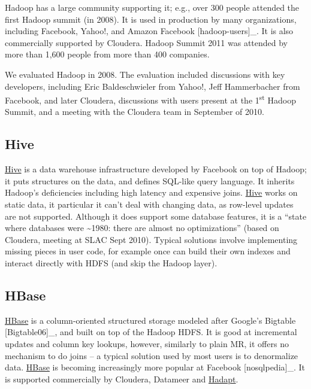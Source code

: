 \documentclass[DM,lsstdraft,toc]{lsstdoc}
\begin{document}
Hadoop has a large community supporting it; e.g., over 300 people
attended the first Hadoop summit (in 2008). It is used in production by
many organizations, including Facebook, Yahoo!, and Amazon Facebook
{[}hadoop-users{]}\_. It is also commercially supported by Cloudera.
Hadoop Summit 2011 was attended by more than 1,600 people from more than
400 companies.

We evaluated Hadoop in 2008. The evaluation included discussions with
key developers, including Eric Baldeschwieler from Yahoo!, Jeff
Hammerbacher from Facebook, and later Cloudera, discussions with users
present at the 1\textsuperscript{st} Hadoop Summit, and a meeting with
the Cloudera team in September of 2010.

\subsection{Hive}\label{hive}

\href{http://wiki.apache.org/hadoop/Hive}{Hive} is a data warehouse
infrastructure developed by Facebook on top of Hadoop; it puts
structures on the data, and defines SQL-like query language. It inherits
Hadoop's deficiencies including high latency and expensive joins.
\href{http://wiki.apache.org/hadoop/Hive}{Hive} works on static data, it
particular it can't deal with changing data, as row-level updates are
not supported. Although it does support some database features, it is a
``state where databases were \textasciitilde{}1980: there are almost no
optimizations'' (based on Cloudera, meeting at SLAC Sept 2010). Typical
solutions involve implementing missing pieces in user code, for example
once can build their own indexes and interact directly with HDFS (and
skip the Hadoop layer).

\subsection{HBase}\label{hbase}

\href{http://hadoop.apache.org/hbase/}{HBase} is a column-oriented
structured storage modeled after Google's Bigtable {[}Bigtable06{]}\_,
and built on top of the Hadoop HDFS. It is good at incremental updates
and column key lookups, however, similarly to plain MR, it offers no
mechanism to do joins -- a typical solution used by most users is to
denormalize data. \href{http://hadoop.apache.org/hbase/}{HBase} is
becoming increasingly more popular at Facebook {[}nosqlpedia{]}\_. It is
supported commercially by Cloudera, Datameer and
\href{http://hadapt.com}{Hadapt}.
\end{document}
